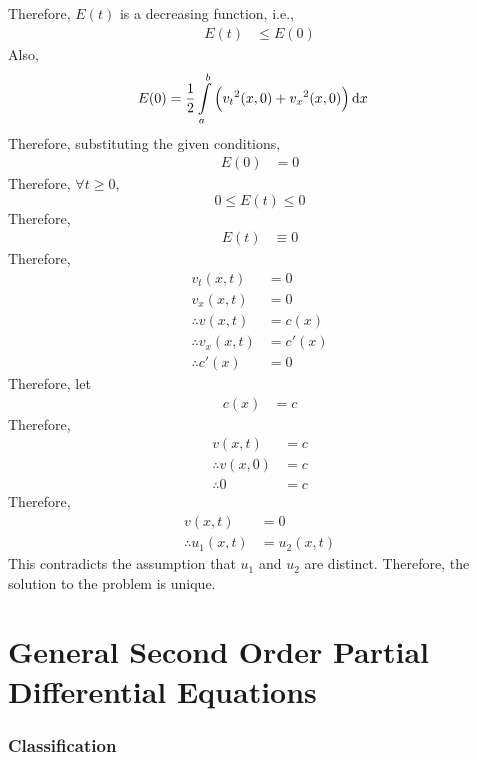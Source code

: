 \documentclass[titlepage, fleqn, a4paper, 12pt, twoside]{article}
\theoremstyle{definition}
\theoremstyle{theorem}
\begin{document}
\begin{solution}
	Therefore, $E(t)$ is a decreasing function, i.e.,
	\begin{align*}
		E(t) & \le E(0)
	\end{align*}
	Also,
	\begin{align*}
		E(0) & = \frac{1}{2} \int\limits_{a}^{b} \left( {v_t}^2(x,0) + {v_x}^2(x,0) \right) \dif x
	\end{align*}
	Therefore, substituting the given conditions,
	\begin{align*}
		E(0) & = 0
	\end{align*}
	Therefore, $\forall t \ge 0$,
	\begin{equation*}
		0 \le E(t) \le 0
	\end{equation*}
	Therefore,
	\begin{align*}
		E(t) & \equiv 0
	\end{align*}
	Therefore,
	\begin{align*}
		v_t(x,t)            & = 0     \\
		v_x(x,t)            & = 0     \\
		\therefore v(x,t)   & = c(x)  \\
		\therefore v_x(x,t) & = c'(x) \\
		\therefore c'(x)    & = 0
	\end{align*}
	Therefore, let
	\begin{align*}
		c(x) & = c
	\end{align*}
	Therefore,
	\begin{align*}
		v(x,t)            & = c \\
		\therefore v(x,0) & = c \\
		\therefore 0      & = c
	\end{align*}
	Therefore,
	\begin{align*}
		v(x,t)              & = 0 \\
		\therefore u_1(x,t) & = u_2(x,t)
	\end{align*}
	This contradicts the assumption that $u_1$ and $u_2$ are distinct.
	Therefore, the solution to the problem is unique.
\end{solution}

\clearpage
\part{General Second Order Partial Differential Equations}

\section{Classification}
\end{document}
